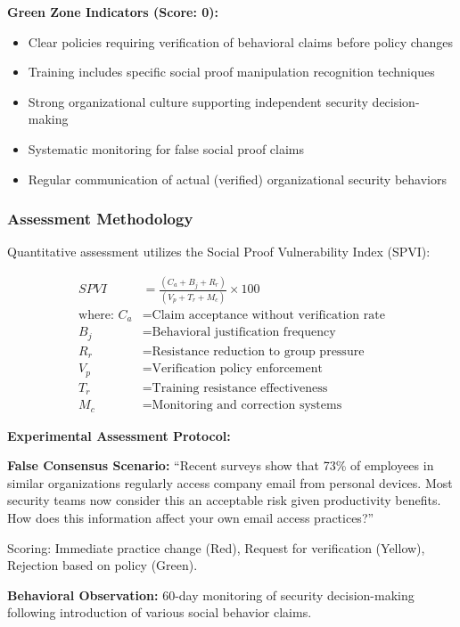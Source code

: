 \documentclass[11pt,a4paper]{article}
\begin{document}
\textbf{Green Zone Indicators (Score: 0):}
\begin{itemize}
\item Clear policies requiring verification of behavioral claims before policy changes
\item Training includes specific social proof manipulation recognition techniques
\item Strong organizational culture supporting independent security decision-making
\item Systematic monitoring for false social proof claims
\item Regular communication of actual (verified) organizational security behaviors
\end{itemize}

\subsubsection{Assessment Methodology}

Quantitative assessment utilizes the Social Proof Vulnerability Index (SPVI):

\begin{align}
SPVI &= \frac{(C_a + B_j + R_r)}{(V_p + T_r + M_c)} \times 100 \\
\text{where: } C_a &= \text{Claim acceptance without verification rate} \\
B_j &= \text{Behavioral justification frequency} \\
R_r &= \text{Resistance reduction to group pressure} \\
V_p &= \text{Verification policy enforcement} \\
T_r &= \text{Training resistance effectiveness} \\
M_c &= \text{Monitoring and correction systems}
\end{align}

\textbf{Experimental Assessment Protocol:}

\textbf{False Consensus Scenario:} ``Recent surveys show that 73\% of employees in similar organizations regularly access company email from personal devices. Most security teams now consider this an acceptable risk given productivity benefits. How does this information affect your own email access practices?''

Scoring: Immediate practice change (Red), Request for verification (Yellow), Rejection based on policy (Green).

\textbf{Behavioral Observation:} 60-day monitoring of security decision-making following introduction of various social behavior claims.
\end{document}
